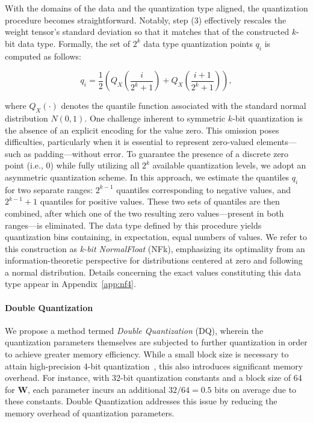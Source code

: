 With the domains of the data and the quantization type aligned, the quantization procedure becomes straightforward. Notably, step (3) effectively rescales the weight tensor’s standard deviation so that it matches that of the constructed $k$-bit data type. Formally, the set of $2^k$ data type quantization points $q_i$ is computed as follows:

\begin{equation}
q_i  = \frac{1}{2}\left( Q_X\left(\frac{i}{2^k+1}\right) + Q_X\left(\frac{i+1}{2^k+1}\right)\right),
\end{equation}

where $Q_X(\cdot)$ denotes the quantile function associated with the standard normal distribution $N(0,1)$. One challenge inherent to symmetric $k$-bit quantization is the absence of an explicit encoding for the value zero. This omission poses difficulties, particularly when it is essential to represent zero-valued elements—such as padding—without error. To guarantee the presence of a discrete zero point (i.e., $0$) while fully utilizing all $2^k$ available quantization levels, we adopt an asymmetric quantization scheme. In this approach, we estimate the quantiles $q_i$ for two separate ranges: $2^{k-1}$ quantiles corresponding to negative values, and $2^{k-1}+1$ quantiles for positive values. These two sets of quantiles are then combined, after which one of the two resulting zero values—present in both ranges—is eliminated. The data type defined by this procedure yields quantization bins containing, in expectation, equal numbers of values. We refer to this construction as \emph{k-bit NormalFloat} (NFk), emphasizing its optimality from an information-theoretic perspective for distributions centered at zero and following a normal distribution. Details concerning the exact values constituting this data type appear in Appendix~\ref{app:nf4}.

\paragraph{Double Quantization{}} 
We propose a method termed \emph{Double Quantization} (DQ), wherein the quantization parameters themselves are subjected to further quantization in order to achieve greater memory efficiency. While a small block size is necessary to attain high-precision 4-bit quantization~\citep{dettmers2022case}, this also introduces significant memory overhead. For instance, with 32-bit quantization constants and a block size of 64 for $\mathbf{W}$, each parameter incurs an additional $32/64 = 0.5$ bits on average due to these constants. Double Quantization addresses this issue by reducing the memory overhead of quantization parameters.

